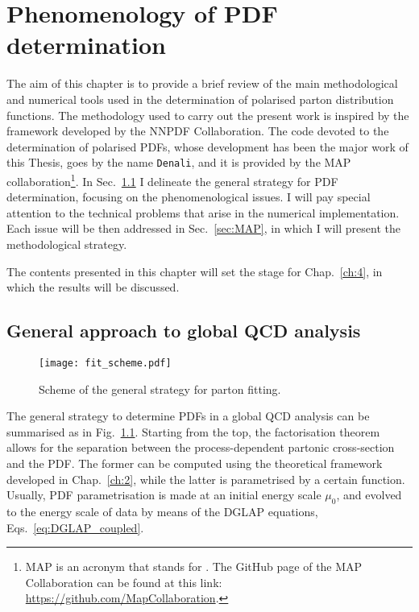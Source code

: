 \chapter{Phenomenology of PDF determination}
\label{ch:3}

The aim of this chapter is to provide a brief review of the main methodological and numerical tools used in the determination of polarised parton distribution functions. The methodology used to carry out the present work is inspired by the framework developed by the NNPDF Collaboration. The code devoted to the determination of polarised PDFs, whose development has been the major work of this Thesis, goes by the name \texttt{Denali}, and it is provided by the MAP collaboration\footnote{\footnotesize MAP is an acronym that stands for . The GitHub page of the MAP Collaboration can be found at this link: \href{https://github.com/MapCollaboration}{https://github.com/MapCollaboration}.}. In Sec.~\ref{sec:gen_fit_str} I delineate the general strategy for PDF determination, focusing on the phenomenological issues. I will pay special attention to the technical problems that arise in the numerical implementation. Each issue will be then addressed in Sec.~\ref{sec:MAP}, in which I will present the methodological strategy.%

The contents presented in this chapter will set the stage for Chap.~\ref{ch:4}, in which the results will be discussed.

\section{General approach to global QCD analysis}
\label{sec:gen_fit_str}

\begin{figure}[t]
  \centering
  \texttt{[image: fit\_scheme.pdf]} 
  \caption{Scheme of the general strategy for parton fitting.}
  \label{fig:fit_strategy}
\end{figure}

The general strategy to determine PDFs in a global QCD analysis can be summarised as in Fig.~\ref{fig:fit_strategy}. Starting from the top, the factorisation theorem allows for the separation between the process-dependent partonic cross-section and the PDF. The former can be computed using the theoretical framework developed in Chap.~\ref{ch:2}, while the latter is parametrised by a certain function. Usually, PDF parametrisation is made at an initial energy scale $\mu_0$, and evolved to the energy scale of data by means of the DGLAP equations, Eqs.~\eqref{eq:DGLAP_coupled}.%

